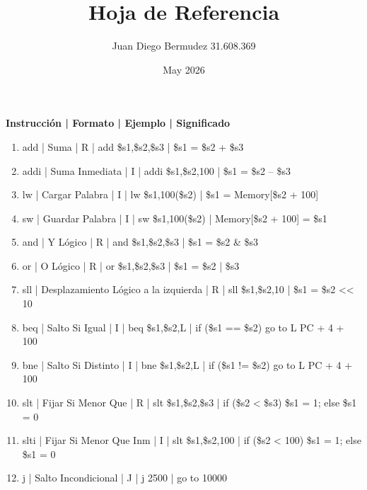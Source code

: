 \documentclass{article}
\title{Hoja de Referencia}
\author{Juan Diego Bermudez 31.608.369}
\date{May 2026}
\begin{document}
\maketitle


\textbf{Instrucción | Formato | Ejemplo | Significado}
\begin{enumerate}
    \item add | Suma | R | add \$s1,\$s2,\$s3  | \$s1 = \$s2 + \$s3
    \item addi | Suma Inmediata | I | addi \$s1,\$s2,100 | \$s1 = \$s2 – \$s3
    \item lw | Cargar Palabra | I | lw \$s1,100(\$s2) | \$s1 = Memory[\$s2 + 100]
    \item sw | Guardar Palabra | I | sw \$s1,100(\$s2) | Memory[\$s2 + 100] = \$s1
    \item and | Y Lógico | R | and \$s1,\$s2,\$s3 | \$s1 = \$s2 \& \$s3
    

    \item or | O Lógico | R | or \$s1,\$s2,\$s3 | \$s1 = \$s2 | \$s3
    \item sll | Desplazamiento Lógico a la izquierda | R | sll \$s1,\$s2,10 | \$s1 = \$s2 << 10
    \item beq | Salto Si Igual | I | beq \$s1,\$s2,L | if (\$s1 == \$s2) go to L PC + 4 + 100
    \item bne | Salto Si Distinto | I | bne \$s1,\$s2,L | if (\$s1 != \$s2) go to L PC + 4 + 100
    \item slt | Fijar Si Menor Que | R | slt \$s1,\$s2,\$s3 | if (\$s2 < \$s3) \$s1 = 1; else \$s1 = 0
    \item slti | Fijar Si Menor Que Inm | I | slt \$s1,\$s2,100 | if (\$s2 < 100) \$s1 = 1; else \$s1 = 0
    \item j | Salto Incondicional | J | j 2500 | go to 10000
\end{enumerate}
\end{document}
